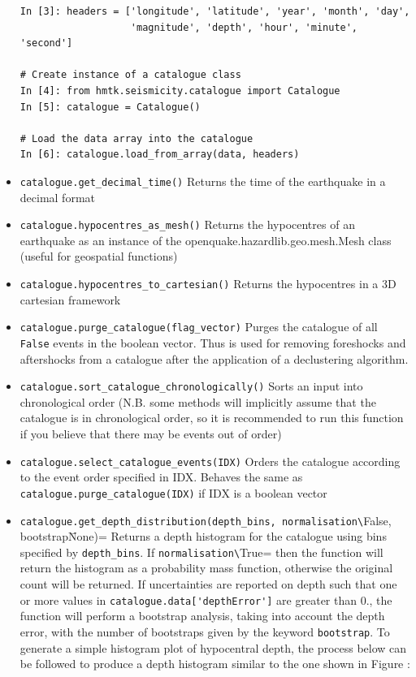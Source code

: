 \begin{itemize}
\begin{Verbatim}[frame=single, commandchars=\\\{\}, fontsize=\scriptsize, samepage=true]
In [3]: headers = ['longitude', 'latitude', 'year', 'month', 'day',
                   'magnitude', 'depth', 'hour', 'minute', 'second']

# Create instance of a catalogue class
In [4]: from hmtk.seismicity.catalogue import Catalogue
In [5]: catalogue = Catalogue()

# Load the data array into the catalogue
In [6]: catalogue.load_from_array(data, headers)

\end{Verbatim}
 

\item \verb=catalogue.get_decimal_time()= Returns the time of the earthquake in a decimal format

\item \verb=catalogue.hypocentres_as_mesh()= Returns the hypocentres of an earthquake as an instance of the openquake.hazardlib.geo.mesh.Mesh class (useful for geospatial functions)

\item \verb=catalogue.hypocentres_to_cartesian()= Returns the hypocentres in a 3D cartesian framework

\item \verb=catalogue.purge_catalogue(flag_vector)= Purges the catalogue of all \verb=False= events in the boolean vector. Thus is used for removing foreshocks and aftershocks from a catalogue after the application of a declustering algorithm.

\item \verb=catalogue.sort_catalogue_chronologically()= Sorts an input into chronological order (N.B. some methods will implicitly assume that the catalogue is in chronological order, so it is recommended to run this function if you believe that there may be events out of order)

\item \verb=catalogue.select_catalogue_events(IDX)= Orders the catalogue according to the event order specified in IDX. Behaves the same as \verb=catalogue.purge_catalogue(IDX)= if IDX is a boolean vector

\item \verb=catalogue.get_depth_distribution(depth_bins, normalisation\=False, bootstrap\=None)= Returns a depth histogram for the catalogue using bins specified by \verb=depth_bins=. If \verb=normalisation\=True= then the function will return the histogram as a probability mass function, otherwise the original count will be returned. If uncertainties are reported on depth such that one or more values in \verb=catalogue.data['depthError']= are greater than 0., the function will perform a bootstrap analysis, taking into account the depth error, with the number of bootstraps given by the keyword \verb=bootstrap=. To generate a simple histogram plot of hypocentral depth, the process below can be followed to produce a depth histogram similar to the one shown in Figure :


\end{itemize}
